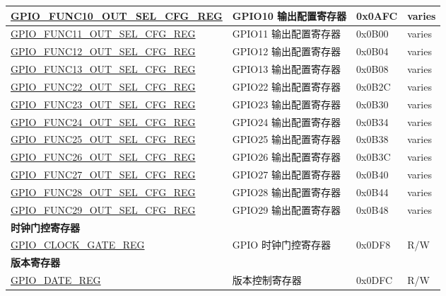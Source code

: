 \begin{longtable}{ | p{6cm} | p{7.2cm} | p{1.3cm} | p{1cm} | }
\hyperref[regdesc:GPIOFUNCNOUTSELCFGREG]{GPIO\_FUNC10\_OUT\_SEL\_CFG\_REG} & GPIO10 输出配置寄存器 & 0x0AFC & varies \\ \hline
\hyperref[regdesc:GPIOFUNCNOUTSELCFGREG]{GPIO\_FUNC11\_OUT\_SEL\_CFG\_REG} & GPIO11 输出配置寄存器 & 0x0B00 & varies \\ \hline
\hyperref[regdesc:GPIOFUNCNOUTSELCFGREG]{GPIO\_FUNC12\_OUT\_SEL\_CFG\_REG} & GPIO12 输出配置寄存器 & 0x0B04 & varies \\ \hline
\hyperref[regdesc:GPIOFUNCNOUTSELCFGREG]{GPIO\_FUNC13\_OUT\_SEL\_CFG\_REG} & GPIO13 输出配置寄存器 & 0x0B08 & varies \\ \hline
\hyperref[regdesc:GPIOFUNCNOUTSELCFGREG]{GPIO\_FUNC22\_OUT\_SEL\_CFG\_REG} & GPIO22 输出配置寄存器 & 0x0B2C & varies \\ \hline
\hyperref[regdesc:GPIOFUNCNOUTSELCFGREG]{GPIO\_FUNC23\_OUT\_SEL\_CFG\_REG} & GPIO23 输出配置寄存器 & 0x0B30 & varies \\ \hline
\hyperref[regdesc:GPIOFUNCNOUTSELCFGREG]{GPIO\_FUNC24\_OUT\_SEL\_CFG\_REG} & GPIO24 输出配置寄存器 & 0x0B34 & varies \\ \hline
\hyperref[regdesc:GPIOFUNCNOUTSELCFGREG]{GPIO\_FUNC25\_OUT\_SEL\_CFG\_REG} & GPIO25 输出配置寄存器 & 0x0B38 & varies \\ \hline
\hyperref[regdesc:GPIOFUNCNOUTSELCFGREG]{GPIO\_FUNC26\_OUT\_SEL\_CFG\_REG} & GPIO26 输出配置寄存器 & 0x0B3C & varies \\ \hline
\hyperref[regdesc:GPIOFUNCNOUTSELCFGREG]{GPIO\_FUNC27\_OUT\_SEL\_CFG\_REG} & GPIO27 输出配置寄存器 & 0x0B40 & varies \\ \hline
\hyperref[regdesc:GPIOFUNCNOUTSELCFGREG]{GPIO\_FUNC28\_OUT\_SEL\_CFG\_REG} & GPIO28 输出配置寄存器 & 0x0B44 & varies \\ \hline
\hyperref[regdesc:GPIOFUNCNOUTSELCFGREG]{GPIO\_FUNC29\_OUT\_SEL\_CFG\_REG} & GPIO29 输出配置寄存器 & 0x0B48 & varies \\ \hline
\multicolumn{4}{|l|}{\textbf{时钟门控寄存器}} \\ \hline
\hyperref[regdesc:GPIOCLOCKGATEREG]{GPIO\_CLOCK\_GATE\_REG} & GPIO 时钟门控寄存器 & 0x0DF8 & R/W \\ \hline
\multicolumn{4}{|l|}{\textbf{版本寄存器}} \\ \hline
\hyperref[regdesc:GPIODATEREG]{GPIO\_DATE\_REG} & 版本控制寄存器 & 0x0DFC & R/W \\ \hline
\end{longtable}
